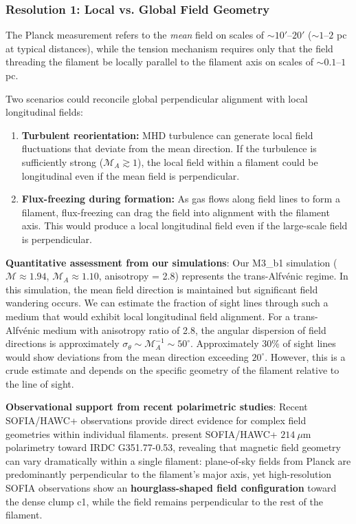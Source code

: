 \documentclass[11pt,a4paper]{article}
\begin{document}
\subsubsection{Resolution 1: Local vs. Global Field Geometry}

The Planck measurement refers to the \emph{mean} field on scales of $\sim 10'$--$20'$ ($\sim 1$--$2$ pc at typical distances), while the tension mechanism requires only that the field threading the filament be locally parallel to the filament axis on scales of $\sim 0.1$--$1$ pc.

Two scenarios could reconcile global perpendicular alignment with local longitudinal fields:
\begin{enumerate}
    \item \textbf{Turbulent reorientation:} MHD turbulence can generate local field fluctuations that deviate from the mean direction. If the turbulence is sufficiently strong ($\mathcal{M}_A \gtrsim 1$), the local field within a filament could be longitudinal even if the mean field is perpendicular.
    \item \textbf{Flux-freezing during formation:} As gas flows along field lines to form a filament, flux-freezing can drag the field into alignment with the filament axis. This would produce a local longitudinal field even if the large-scale field is perpendicular.
\end{enumerate}

\textbf{Quantitative assessment from our simulations}: Our M3\_b1 simulation ($\mathcal{M} \approx 1.94$, $\mathcal{M}_A \approx 1.10$, anisotropy = 2.8) represents the trans-Alfv\'enic regime. In this simulation, the mean field direction is maintained but significant field wandering occurs. We can estimate the fraction of sight lines through such a medium that would exhibit local longitudinal field alignment. For a trans-Alfv\'enic medium with anisotropy ratio of 2.8, the angular dispersion of field directions is approximately $\sigma_\theta \sim \mathcal{M}_A^{-1} \sim 50^\circ$. Approximately 30\% of sight lines would show deviations from the mean direction exceeding $20^\circ$. However, this is a crude estimate and depends on the specific geometry of the filament relative to the line of sight.

\textbf{Observational support from recent polarimetric studies}: Recent SOFIA/HAWC+ observations provide direct evidence for complex field geometries within individual filaments. \citet{Jadhav2026} present SOFIA/HAWC+ $214~\mu$m polarimetry toward IRDC G351.77-0.53, revealing that magnetic field geometry can vary dramatically within a single filament: plane-of-sky fields from Planck are predominantly perpendicular to the filament's major axis, yet high-resolution SOFIA observations show an \textbf{hourglass-shaped field configuration} toward the dense clump c1, while the field remains perpendicular to the rest of the filament.
\end{document}
